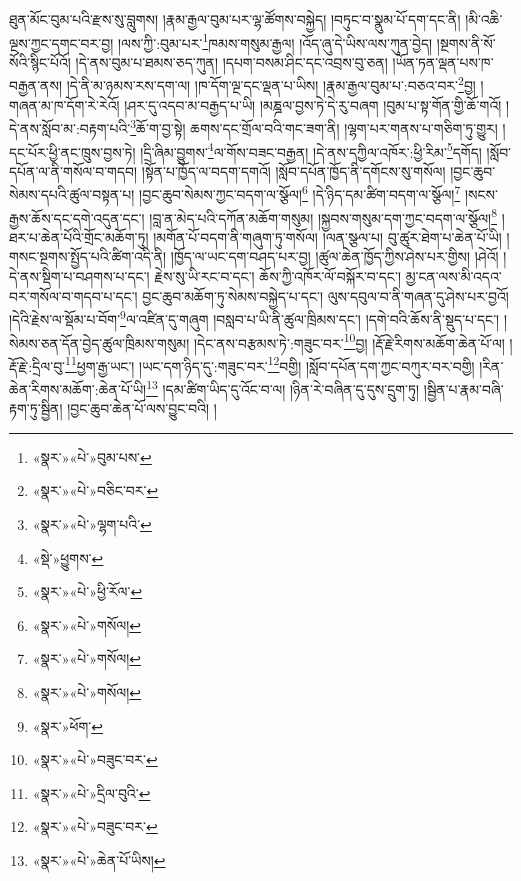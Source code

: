 ཐུན་མོང་བུམ་པའི་རྫས་སུ་བླུགས། །རྣམ་རྒྱལ་བུམ་པར་ལྷ་ཚོགས་བསྐྱེད། །བཏུང་བ་སྣུམ་པོ་དག་དང་ནི། །མི་འཆི་ལྔས་ཀྱང་དགང་བར་བྱ། །ལས་ཀྱི་:བུམ་པར་\footnote{«སྣར་»«པེ་»བུམ་པས་}ཁམས་གསུམ་རྒྱལ། །འོད་ཞུ་དེ་ཡིས་ལས་ཀུན་བྱེད། །སྔགས་ནི་སོ་སོའི་སྙིང་པོའོ། །དེ་ནས་བུམ་པ་ཐམས་ཅད་ཀུན། །དཔག་བསམ་ཤིང་དང་འབྲས་བུ་ཅན། །ཡོན་ཏན་ལྡན་པས་ཁ་བརྒྱན་ནས། །དེ་ནི་མ་ཉམས་རས་དག་ལ། །ཁ་དོག་ལྔ་དང་ལྡན་པ་ཡིས། །རྣམ་རྒྱལ་བུམ་པ་:བཅའ་བར་\footnote{«སྣར་»«པེ་»བཅིང་བར་}བྱ། །གཞན་མ་ཁ་དོག་རེ་རེའོ། །ཤར་དུ་འདབ་མ་བརྒྱད་པ་ཡི། །མཎྜལ་བྱས་ཏེ་དེ་རུ་བཞག །བུམ་པ་སྟ་གོན་གྱི་ཆོ་གའོ། །དེ་ནས་སློབ་མ་:བརྟག་པའི་\footnote{«སྣར་»«པེ་»ལྷག་པའི་}ཆོ་ག་བྱ་སྟེ། ཆགས་དང་གྲོལ་བའི་གང་ཟག་ནི། །ལྷག་པར་གནས་པ་གཅིག་ཏུ་གྱུར། །དང་པོར་ཕྱི་ནང་ཁྲུས་བྱས་ཏེ། །དྲི་ཞིམ་བྱུགས་\footnote{«སྡེ་»ཕྱུགས་}ལ་གོས་བཟང་བརྒྱན། །དེ་ནས་དཀྱིལ་འཁོར་:ཕྱི་རིམ་\footnote{«སྣར་»«པེ་»ཕྱི་རོལ་}དགོད། །སློབ་དཔོན་ལ་ནི་གསོལ་བ་གདབ། །སྟོན་པ་ཁྱོད་ལ་བདག་དགའོ། །སློབ་དཔོན་ཁྱོད་ནི་དགོངས་སུ་གསོལ། །བྱང་ཆུབ་སེམས་དཔའི་ཚུལ་བསྟན་པ། །བྱང་ཆུབ་སེམས་ཀྱང་བདག་ལ་སྩོལ།\footnote{«སྣར་»«པེ་»གསོལ།} །དེ་ཉིད་དམ་ཚིག་བདག་ལ་སྩོལ།\footnote{«སྣར་»«པེ་»གསོལ།} །སངས་རྒྱས་ཆོས་དང་དགེ་འདུན་དང་། །བླ་ན་མེད་པའི་དཀོན་མཆོག་གསུམ། །སྐྱབས་གསུམ་དག་ཀྱང་བདག་ལ་སྩོལ།\footnote{«སྣར་»«པེ་»གསོལ།} །ཐར་པ་ཆེན་པོའི་གྲོང་མཆོག་ཏུ། །མགོན་པོ་བདག་ནི་གཞུག་ཏུ་གསོལ། །ལན་སྩལ་པ། བུ་ཚུར་ཐེག་པ་ཆེན་པོ་ཡི། །གསང་སྔགས་སྤྱོད་པའི་ཚིག་འདི་ནི། །ཁྱོད་ལ་ཡང་དག་བཤད་པར་བྱ། །ཚུལ་ཆེན་ཁྱོད་ཀྱིས་ཤེས་པར་གྱིས། །ཤེའོ། །དེ་ནས་སྡིག་པ་བཤགས་པ་དང་། རྗེས་སུ་ཡི་རང་བ་དང་། ཆོས་ཀྱི་འཁོར་ལོ་བསྐོར་བ་དང་། མྱ་ངན་ལས་མི་འདའ་བར་གསོལ་བ་གདབ་པ་དང་། བྱང་ཆུབ་མཆོག་ཏུ་སེམས་བསྐྱེད་པ་དང་། ལུས་དབུལ་བ་ནི་གཞན་དུ་ཤེས་པར་བྱའོ། །དེའི་རྗེས་ལ་སྡོམ་པ་བོག་\footnote{«སྣར་»ཕོག་}ལ་འཛིན་དུ་གཞུག །བསླབ་པ་ཡི་ནི་ཚུལ་ཁྲིམས་དང་། །དགེ་བའི་ཆོས་ནི་སྡུད་པ་དང་། །སེམས་ཅན་དོན་བྱེད་ཚུལ་ཁྲིམས་གསུམ། །དེང་ནས་བརྩམས་ཏེ་:གཟུང་བར་\footnote{«སྣར་»«པེ་»བཟུང་བར་}བྱ། །རྡོ་རྗེ་རིགས་མཆོག་ཆེན་པོ་ལ། །རྡོ་རྗེ་:དྲིལ་བུ་\footnote{«སྣར་»«པེ་»དྲིལ་བུའི་}ཕྱག་རྒྱ་ཡང་། །ཡང་དག་ཉིད་དུ་:གཟུང་བར་\footnote{«སྣར་»«པེ་»བཟུང་བར་}བགྱི། །སློབ་དཔོན་དག་ཀྱང་བཀུར་བར་བགྱི། །རིན་ཆེན་རིགས་མཆོག་:ཆེན་པོ་ཡི།\footnote{«སྣར་»«པེ་»ཆེན་པོ་ཡིས།} །དམ་ཚིག་ཡིད་དུ་འོང་བ་ལ། །ཉིན་རེ་བཞིན་དུ་དུས་དྲུག་ཏུ། །སྦྱིན་པ་རྣམ་བཞི་རྟག་ཏུ་སྦྱིན། །བྱང་ཆུབ་ཆེན་པོ་ལས་བྱུང་བའི། །
